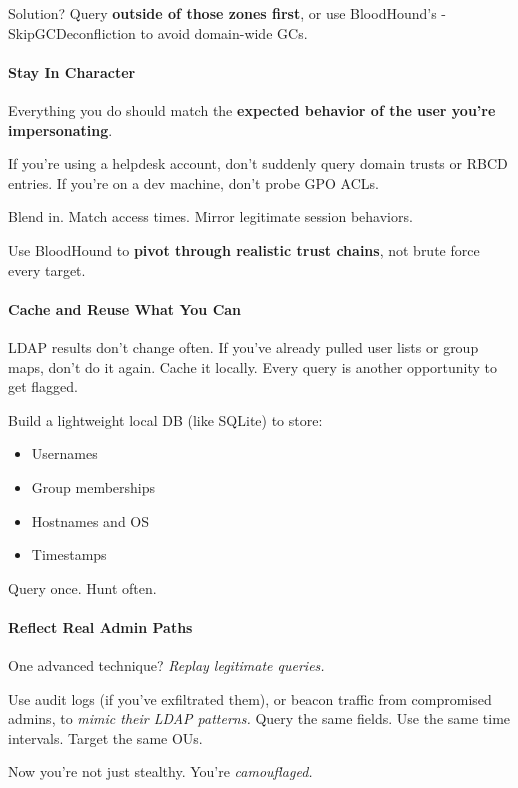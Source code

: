 Solution? Query \textbf{outside of those zones first}, or use BloodHound’s -SkipGCDeconfliction to avoid domain-wide GCs.

\paragraph{\textbf{   Stay In Character}}

Everything you do should match the \textbf{expected behavior of the user you’re impersonating}.

If you’re using a helpdesk account, don’t suddenly query domain trusts or RBCD entries. If you’re on a dev machine, don’t probe GPO ACLs.

Blend in. Match access times. Mirror legitimate session behaviors.

Use BloodHound to \textbf{pivot through realistic trust chains}, not brute force every target.

\paragraph{\textbf{   Cache and Reuse What You Can}}

LDAP results don’t change often. If you’ve already pulled user lists or group maps, don’t do it again. Cache it locally. Every query is another opportunity to get flagged.

Build a lightweight local DB (like SQLite) to store:

\begin{itemize}
    \item Usernames
    \item Group memberships
    \item Hostnames and OS
    \item Timestamps

\end{itemize}
Query once. Hunt often.

\paragraph{\textbf{Reflect Real Admin Paths}}

One advanced technique? \textit{Replay legitimate queries.}

Use audit logs (if you’ve exfiltrated them), or beacon traffic from compromised admins, to \textit{mimic their LDAP patterns.} Query the same fields. Use the same time intervals. Target the same OUs.

Now you’re not just stealthy. You’re \textit{camouflaged.}

